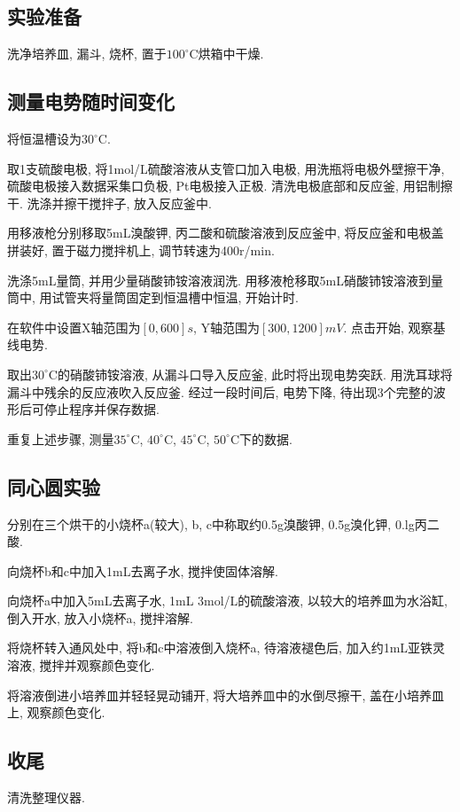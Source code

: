 \documentclass[a4paper]{article}
\begin{document}
\subsection{实验准备}
洗净培养皿, 漏斗, 烧杯, 置于$100^\circ$C烘箱中干燥.
\subsection{测量电势随时间变化}
将恒温槽设为$30^\circ$C.\par
取1支硫酸电极, 将1mol/L硫酸溶液从支管口加入电极, 用洗瓶将电极外壁擦干净, 
硫酸电极接入数据采集口负极, Pt电极接入正极. 清洗电极底部和反应釜, 用铝制擦干. 
洗涤并擦干搅拌子, 放入反应釜中.\par
用移液枪分别移取5mL溴酸钾, 丙二酸和硫酸溶液到反应釜中, 将反应釜和电极盖拼装好, 
置于磁力搅拌机上, 调节转速为400r/min.\par
洗涤5mL量筒, 并用少量硝酸铈铵溶液润洗. 用移液枪移取5mL硝酸铈铵溶液到量筒中, 
用试管夹将量筒固定到恒温槽中恒温, 开始计时.\par
在软件中设置X轴范围为$[0, 600]s$, Y轴范围为$[300, 1200]mV$. 点击开始, 观察基线电势. \par
取出$30^\circ$C的硝酸铈铵溶液, 从漏斗口导入反应釜, 此时将出现电势突跃. 
用洗耳球将漏斗中残余的反应液吹入反应釜. 经过一段时间后, 电势下降, 
待出现3个完整的波形后可停止程序并保存数据.\par
重复上述步骤, 测量$35^\circ$C, $40^\circ$C, $45^\circ$C, $50^\circ$C下的数据.
\subsection{同心圆实验}
分别在三个烘干的小烧杯a(较大), b, c中称取约0.5g溴酸钾, 0.5g溴化钾, 0.lg丙二酸.\par
向烧杯b和c中加入1mL去离子水, 搅拌使固体溶解.\par
向烧杯a中加入5mL去离子水, 1mL 3mol/L的硫酸溶液, 以较大的培养皿为水浴缸, 倒入开水, 
放入小烧杯a, 搅拌溶解.\par
将烧杯转入通风处中, 将b和c中溶液倒入烧杯a, 待溶液褪色后, 加入约1mL亚铁灵溶液, 搅拌并观察颜色变化.\par
将溶液倒进小培养皿并轻轻晃动铺开, 将大培养皿中的水倒尽擦干, 盖在小培养皿上, 观察颜色变化.
\subsection{收尾}
清洗整理仪器.
\end{document}
